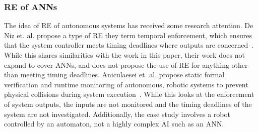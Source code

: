 \subsubsection{\acf{RE} of \acfp{ANN}}
The idea of \ac{RE} of autonomous systems has received some research attention. 
De Niz et. al. propose a type of \ac{RE} they term temporal enforcement, which ensures that the system controller meets timing deadlines where outputs are concerned~\cite{safe-enforce-auto}. 
While this shares similarities with the work in this paper, their work does not expand to cover \acp{ANN}, and does not propose the use of \ac{RE} for anything other than meeting timing deadlines.
Aniculaesei et. al. propose static formal verification and runtime monitoring of autonomous, robotic systems to prevent physical collisions during system execution~\cite{runtime-monitor}.
While this looks at the enforcement of system outputs, the inputs are not monitored and the timing deadlines of the system are not investigated. 
Additionally, the case study involves a robot controlled by an automaton, not a highly complex \ac{AI} such as an \ac{ANN}.
